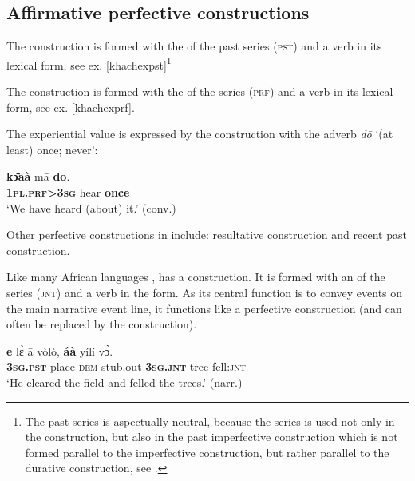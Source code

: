 \documentclass[output=paper]{LSP/langsci}
\begin{document}
\subsection{Affirmative perfective constructions}
\label{khachsecaffp}

The  construction is formed with the  of the past series (\textsc{pst}) and a verb in its lexical form, see ex. \ref{khachexpst}\footnote{The past  series is aspectually neutral, because the series is used not only in the  construction, but also in the past imperfective construction which is not formed parallel to the imperfective construction, but rather parallel to the durative construction, see \citet[195-196]{khachgramm}.}

The  construction is formed with the  of the  series (\textsc{prf}) and a verb in its lexical form, see ex. \ref{khachexprf}.


The experiential value is expressed by the  construction with the adverb \textit{dō} ‘(at least) once; never’:

\begin{exe}\ex
\gll	\textbf{kɔ̄āà}	mā	\textbf{dō}.	\\
	\textbf{1\textsc{pl}.\textsc{prf}>3\textsc{sg}}	hear	\textbf{once}	\\			
\glt ‘We have heard (about) it.’ (conv.)
\end{exe}

Other perfective constructions in  include: resultative construction and recent past construction.

Like many African languages \citep{khachcarlson1992},  has a  construction. It is formed with an  of the  series (\textsc{jnt}) and a verb in the  form. As its central function is to convey events on the main narrative event line, it functions like a perfective construction (and can often be replaced by the  construction).

\begin{exe} \ex
\gll \textbf{ē}      lɛ̀      ā vòlò, \textbf{áà}  yílí     vɔ̀.\\
 \textbf{3\textsc{sg.pst}} place      \textsc{dem} stub.out \textbf{3\textsc{sg}.\textsc{jnt}} tree   fell:\textsc{jnt}\\
\glt `He cleared the field and felled the trees.' (narr.)
\end{exe}
\end{document}
